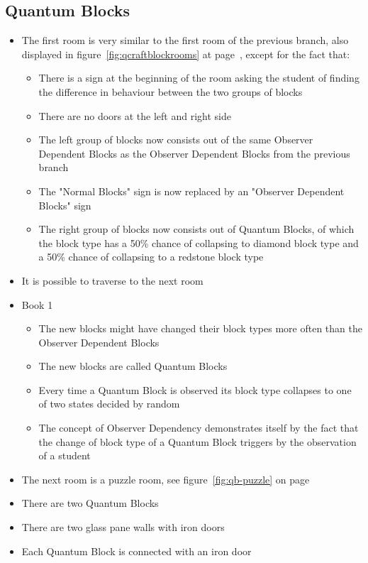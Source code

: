 \documentclass[11pt,twoside]{report} %
\begin{document}
\subsection{Quantum Blocks}
\begin{itemize}
	\item The first room is very similar to the first room of the previous branch, also displayed in figure~\ref{fig:qcraftblockrooms} at page~\pageref{fig:qcraftblockrooms}, except for the fact that:
	\begin{itemize}
		\item There is a sign at the beginning of the room asking the student of finding the difference in behaviour between the two groups of blocks
		\item There are no doors at the left and right side
		\item The left group of blocks now consists out of the same Observer Dependent Blocks as the Observer Dependent Blocks from the previous branch
		\item The "Normal Blocks" sign is now replaced by an "Observer Dependent Blocks" sign
		\item The right group of blocks now consists out of Quantum Blocks, of which the block type has a 50\% chance of collapsing to diamond block type and a 50\% chance of collapsing to a redstone block type
	\end{itemize}
	\item It is possible to traverse to the next room
	\item Book 1
	\begin{itemize}
		\item The new blocks might have changed their block types more often than the Observer Dependent Blocks
		\item The new blocks are called Quantum Blocks
		\item Every time a Quantum Block is observed its block type collapses to one of two states decided by random
		\item The concept of Observer Dependency demonstrates itself by the fact that the change of block type of a Quantum Block triggers by the observation of a student
	\end{itemize}
	\item The next room is a puzzle room, see figure~\ref{fig:qb-puzzle} on page~\pageref{fig:qb-puzzle}
	\item There are two Quantum Blocks
	\item There are two glass pane walls with iron doors
	\item Each Quantum Block is connected with an iron door

\end{itemize}
\end{document}
